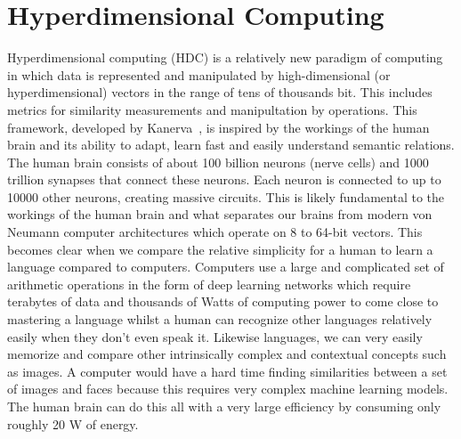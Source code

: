 \chapter[Hyperdimensional computing]%
{Hyperdimensional Computing}
Hyperdimensional computing (HDC) is a relatively new paradigm of computing in which data is represented and manipulated by high-dimensional (or hyperdimensional) vectors in the range of tens of thousands bit. This includes metrics for similarity measurements and manipultation by operations. This framework, developed by Kanerva~\cite{Kanerva2009}, is inspired by the workings of the human brain and its ability to adapt, learn fast and easily understand semantic relations. The human brain consists of about 100 billion neurons (nerve cells) and 1000 trillion synapses that connect these neurons. Each neuron is connected to up to 10000 other neurons, creating massive circuits. This is likely fundamental to the workings of the human brain and what separates our brains from modern von Neumann computer architectures which operate on 8 to 64-bit vectors. This becomes clear when we compare the relative simplicity for a human to learn a language compared to computers. Computers use a large and complicated set of arithmetic operations in the form of deep learning networks which require terabytes of data and thousands of Watts of computing power to come close to mastering a language whilst a human can recognize other languages relatively easily when they don't even speak it. Likewise languages, we can very easily memorize and compare other intrinsically complex and contextual concepts such as images. A computer would have a hard time finding similarities between a set of images and faces because this requires very complex machine learning models. The human brain can do this all with a very large efficiency by consuming only roughly 20 W of energy.

